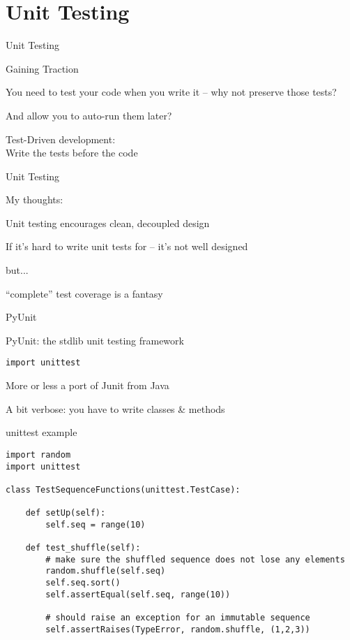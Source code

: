 \documentclass{beamer}
\begin{document}
\section{Unit Testing}

\begin{frame}[fragile]{Unit Testing}

{\LARGE Gaining Traction}

\vfill
{\Large You need to test your code when you write it -- why not preserve those tests?}

\vfill
{\Large And allow you to auto-run them later?}

\vfill
{\LARGE Test-Driven development:}\\[0.1in]
{\Large \hspace{0.3in} Write the tests before the code}

\end{frame} 

\begin{frame}[fragile]{Unit Testing}

{\LARGE My thoughts:}

\vfill
{\Large Unit testing encourages clean, decoupled design}

\vfill
{\Large If it's hard to write unit tests for -- it's not well designed}

\vfill
{\Large but...}

\vfill
{\Large ``complete'' test coverage is a fantasy}

\end{frame} 


\begin{frame}[fragile]{PyUnit}

{\LARGE PyUnit: the stdlib unit testing framework}

\vfill
{\Large \verb|import unittest|}

\vfill
{\Large More or less a port of Junit from Java}

\vfill
{\Large A bit verbose: you have to write classes \& methods}

\end{frame} 

\begin{frame}[fragile]{unittest example}

{\small
\begin{verbatim}
import random
import unittest

class TestSequenceFunctions(unittest.TestCase):

    def setUp(self):
        self.seq = range(10)

    def test_shuffle(self):
        # make sure the shuffled sequence does not lose any elements
        random.shuffle(self.seq)
        self.seq.sort()
        self.assertEqual(self.seq, range(10))

        # should raise an exception for an immutable sequence
        self.assertRaises(TypeError, random.shuffle, (1,2,3))
\end{verbatim}
}

\end{frame} 
\end{document}
